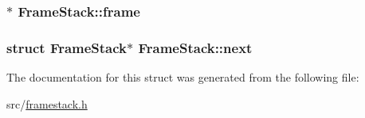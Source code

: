 \subsubsection[{\texorpdfstring{frame}{frame}}]{$\ast$ Frame\+Stack\+::frame}\hypertarget{structFrameStack_a6175986505277602d1e3cdc9fbbfb8b4}{}\label{structFrameStack_a6175986505277602d1e3cdc9fbbfb8b4}
\subsubsection[{\texorpdfstring{next}{next}}]{\setlength{\rightskip}{0pt plus 5cm}struct {\bf Frame\+Stack}$\ast$ Frame\+Stack\+::next}\hypertarget{structFrameStack_a7b333d40fd3fda54503169413dec8ddd}{}\label{structFrameStack_a7b333d40fd3fda54503169413dec8ddd}


The documentation for this struct was generated from the following file\+:\begin{DoxyCompactItemize}
\item 
src/\hyperlink{framestack_8h}{framestack.\+h}\end{DoxyCompactItemize}
